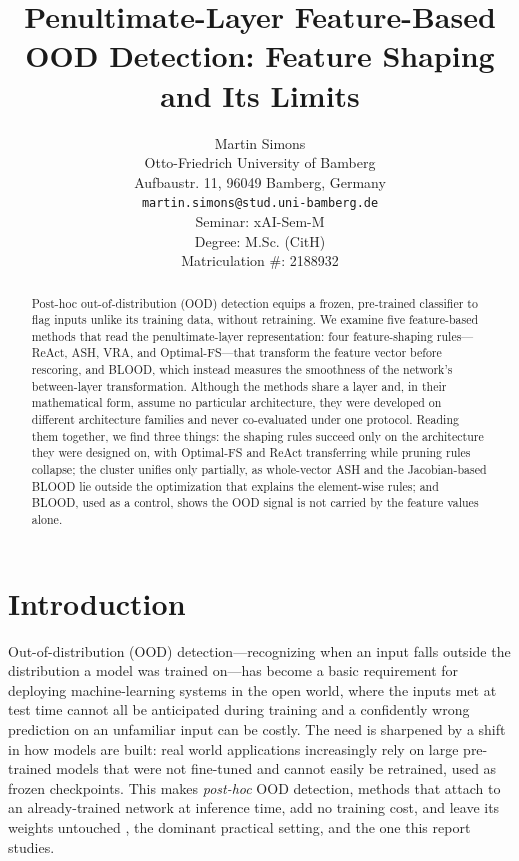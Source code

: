 \documentclass[a4paper]{article}
\title{Penultimate-Layer Feature-Based OOD Detection: Feature Shaping and Its Limits}
\author{%
  Martin Simons\\
  Otto-Friedrich University of Bamberg\\
  Aufbaustr. 11, 96049 Bamberg, Germany\\
  \texttt{martin.simons@stud.uni-bamberg.de} \\[0.5cm]
  Seminar: xAI-Sem-M \\
  Degree: M.Sc. (CitH) \\
  Matriculation \#: 2188932
}
\begin{document}
\maketitle
\def\va{{\bm{a}}}

\begin{abstract}
  Post-hoc out-of-distribution (OOD) detection equips a frozen, pre-trained
  classifier to flag inputs unlike its training data, without retraining. We examine
  five feature-based methods that read the penultimate-layer representation: four
  feature-shaping rules---ReAct, ASH, VRA, and Optimal-FS---that transform the feature
  vector before rescoring, and BLOOD, which instead measures the smoothness of the
  network's between-layer transformation. Although the methods share a layer and, in
  their mathematical form, assume no particular architecture, they were developed on
  different architecture families and never co-evaluated under one protocol. Reading
  them together, we find three things: the shaping rules succeed only on the
  architecture they were designed on, with Optimal-FS and ReAct transferring while pruning rules collapse; the
  cluster unifies only partially, as whole-vector ASH and the Jacobian-based BLOOD lie
  outside the optimization that explains the element-wise rules; and BLOOD, used as a
  control, shows the OOD signal is not carried by the feature values alone.
\end{abstract}


\section{Introduction}
\label{intro}


Out-of-distribution (OOD) detection---recognizing when an input falls outside the
distribution a model was trained on---has become a basic requirement for deploying
machine-learning systems in the open world, where the inputs met at test time cannot
all be anticipated during training and a confidently wrong prediction on an unfamiliar
input can be costly. The need is sharpened by a shift in how models are built:
real world applications increasingly rely on large pre-trained models that were not fine-tuned and
cannot easily be retrained, used as frozen checkpoints. This makes \emph{post-hoc}
OOD detection, methods that attach to an already-trained network at inference time,
add no training cost, and leave its weights untouched \cite{survey}, the dominant practical setting,
and the one this report studies.
\end{document}
